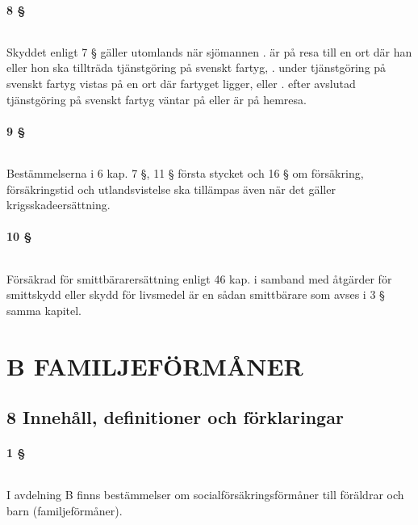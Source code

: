 \documentclass[a4paper,notitlepage,openany,10pt]{book}
\begin{document}
\subsection*{8 §}
\paragraph*{}
Skyddet enligt 7 § gäller utomlands när sjömannen
. är på resa till en ort där han eller hon ska tillträda tjänstgöring på svenskt fartyg,
. under tjänstgöring på svenskt fartyg vistas på en ort där fartyget ligger, eller
. efter avslutad tjänstgöring på svenskt fartyg väntar på eller är på hemresa.
\subsection*{9 §}
\paragraph*{}
Bestämmelserna i 6 kap. 7 §, 11 § första stycket och 16 § om försäkring, försäkringstid och utlandsvistelse ska tillämpas även när det gäller krigsskadeersättning.
\subsection*{10 §}
\paragraph*{}
Försäkrad för smittbärarersättning enligt 46 kap. i samband med åtgärder för smittskydd eller skydd för livsmedel är en sådan smittbärare som avses i 3 § samma kapitel.
\part*{B FAMILJEFÖRMÅNER}
\chapter*{8 Innehåll, definitioner och förklaringar}
\subsection*{1 §}
\paragraph*{}
I avdelning B finns bestämmelser om socialförsäkringsförmåner till föräldrar och barn (familjeförmåner).
\end{document}
